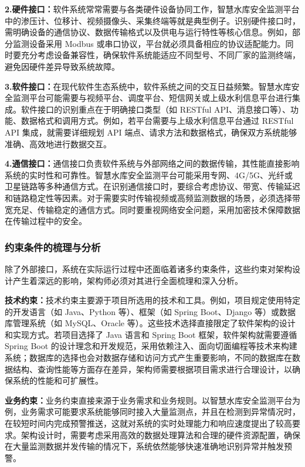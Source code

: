 \textbf{2.硬件接口：}软件系统常常需要与各类硬件设备协同工作，智慧水库安全监测平台中的渗压计、位移计、视频摄像头、采集终端等就是典型例子。识别硬件接口时，需明确设备的通信协议、数据传输格式以及供电与运行特性等核心信息。例如，部分监测设备采用 Modbus 或串口协议，平台就必须具备相应的协议适配能力。同时要充分考虑设备兼容性，确保软件系统能适应不同型号、不同厂家的监测终端，避免因硬件差异导致系统故障。

\textbf{3.软件接口：}在现代软件生态系统中，软件系统之间的交互日益频繁。智慧水库安全监测平台可能需要与视频平台、调度平台、短信网关或上级水利信息平台进行集成。软件接口的识别重点在于明确接口类型（如 RESTful API、消息接口等）、功能、数据格式和调用方式。例如，若平台需要与上级水利信息平台通过 RESTful API 集成，就需要详细规划 API 端点、请求方法和数据格式，确保双方系统能够准确、高效地进行数据交互。

\textbf{4.通信接口：}通信接口负责软件系统与外部网络之间的数据传输，其性能直接影响系统的实时性和可靠性。智慧水库安全监测平台可能采用专网、4G/5G、光纤或卫星链路等多种通信方式。在识别通信接口时，要综合考虑协议、带宽、传输延迟和链路稳定性等因素。对于需要实时传输视频或高频监测数据的场景，必须选择带宽充足、传输稳定的通信方式。同时要重视网络安全问题，采用加密技术保障数据在传输过程中的安全。

\subsubsection{约束条件的梳理与分析}
除了外部接口，系统在实际运行过程中还面临着诸多约束条件，这些约束对架构设计产生着深远的影响，架构师必须对其进行全面梳理和深入分析。

\textbf{技术约束：}技术约束主要源于项目所选用的技术和工具。例如，项目规定使用特定的开发语言（如 Java、Python 等）、框架（如 Spring Boot、Django 等）或数据库管理系统（如 MySQL、Oracle 等）。这些技术选择直接限定了软件架构的设计和实现方式。若项目选择了 Java 语言和 Spring Boot 框架，软件架构就需要遵循 Spring Boot 的设计理念和开发规范，采用依赖注入、面向切面编程等技术来构建系统；数据库的选择也会对数据存储和访问方式产生重要影响，不同的数据库在数据结构、查询性能等方面存在差异，架构师需要根据项目需求进行合理设计，以确保系统的性能和可扩展性。

\textbf{业务约束：}业务约束直接来源于业务需求和业务规则。以智慧水库安全监测平台为例，业务需求可能要求系统能够同时接入大量监测点，并且在检测到异常情况时，在较短时间内完成预警推送，这就对系统的实时处理能力和响应速度提出了较高要求。架构设计时，需要考虑采用高效的数据处理算法和合理的硬件资源配置，确保在大量监测数据并发传输的情况下，系统依然能够快速准确地识别异常并触发预警。

